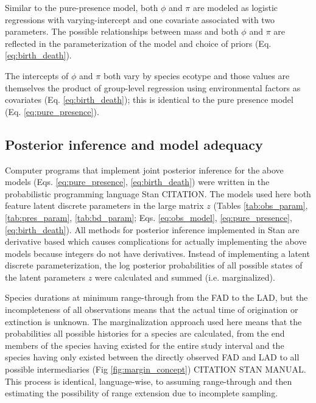 \documentclass[12pt,letterpaper]{article}
\begin{document}
Similar to the pure-presence model, both \(\phi\) and \(\pi\) are modeled as logistic regressions with varying-intercept and one covariate associated with two parameters. The possible relationships between mass and both \(\phi\) and \(\pi\) are reflected in the parameterization of the model and choice of priors (Eq. \ref{eq:birth_death}).

The intercepts of \(\phi\) and \(\pi\) both vary by species ecotype and those values are themselves the product of group-level regression using environmental factors as covariates (Eq. \ref{eq:birth_death}); this is identical to the pure presence model (Eq. \ref{eq:pure_presence}).


\subsection*{Posterior inference and model adequacy}
Computer programs that implement joint posterior inference for the above models (Eqs. \ref{eq:pure_presence}, \ref{eq:birth_death}) were written in the probabilistic programming language Stan CITATION. The models used here both feature latent discrete parameters in the large matrix \(z\) (Tables \ref{tab:obs_param}, \ref{tab:pres_param}, \ref{tab:bd_param}; Eqs. \ref{eq:obs_model}, \ref{eq:pure_presence}, \ref{eq:birth_death}). All methods for posterior inference implemented in Stan are derivative based which causes complications for actually implementing the above models because integers do not have derivatives. Instead of implementing a latent discrete parameterization, the log posterior probabilities of all possible states of the latent parameters \(z\) were calculated and summed (i.e. marginalized). 

Species durations at minimum range-through from the FAD to the LAD, but the incompleteness of all observations means that the actual time of origination or extinction is unknown. The marginalization approach used here means that the probabilities all possible histories for a species are calculated, from the end members of the species having existed for the entire study interval and the species having only existed between the directly observed FAD and LAD to all possible intermediaries (Fig \ref{fig:margin_concept}) CITATION STAN MANUAL. This process is identical, language-wise, to assuming range-through and then estimating the possibility of range extension due to incomplete sampling. %
\end{document}
